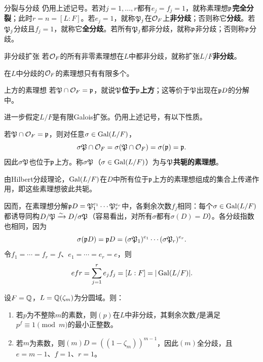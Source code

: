 \begin{definition*}{分裂与分歧}
仍用上述记号。若对$j=1,\ldots,r$都有$e_j=f_j=1$，就称素理想$\mathfrak{p}$\textbf{完全分裂}；此时$r=n=[L:F]$。若$e_j=1$，就称$\mathfrak{P}_j$在$\mathcal O_F$上\textbf{非分歧}；否则称它\textbf{分歧}。若$\mathfrak{P}_j$分歧且$f_j=1$，就称它\textbf{全分歧}。若所有$\mathfrak{P}_j$都非分歧，就称$\mathfrak{p}$非分歧；否则称$\mathfrak{p}$分歧。
\end{definition*}
\begin{definition*}{非分歧扩张}
若$\mathcal O_F$的所有非零素理想在$L$中都非分歧，就称扩张$L/F$\textbf{非分歧}。
\end{definition*}
\begin{property}在$L$中分歧的$\mathcal O_F$的素理想只有有限多个。\end{property}
\begin{definition*}{上方的素理想}
若$\mathfrak{P}\cap\mathcal O_F=\mathfrak{p}$，就说$\mathfrak{P}$\textbf{位于$\mathfrak{p}$上方}；这等价于$\mathfrak{P}$出现在$\mathfrak{p} D$的分解中。
\end{definition*}
进一步假定$L/F$是有限Galois扩张。仍用上述记号，有以下性质。
\begin{property}
若$\mathfrak{P}\cap\mathcal O_F=\mathfrak{p}$，则对任意$\sigma\in\operatorname{Gal}(L/F)$，
\[\sigma\mathfrak{P}\cap\mathcal O_F=\sigma(\mathfrak{P}\cap\mathcal O_F)=\sigma(\mathfrak{p})=\mathfrak{p}.\]
因此$\sigma\mathfrak{P}$也位于$\mathfrak{p}$上方。称$\sigma\mathfrak{P}$（$\sigma\in\operatorname{Gal}(L/F)$）为与$\mathfrak{P}$\textbf{共轭的素理想}。

由Hilbert分歧理论，$\operatorname{Gal}(L/F)$在$D$中所有位于$\mathfrak{p}$上方的素理想组成的集合上传递作用，即这些素理想彼此共轭。
\end{property}
\begin{property}
因而，在素理想分解$\mathfrak{p} D=\mathfrak{P}_1^{e_1}\cdots\mathfrak{P}_r^{e_r}$中，各剩余次数$f_j$相同：每个$\sigma\in\operatorname{Gal}(L/F)$都诱导同构$D/\mathfrak{P}\xrightarrow{\sim}D/\sigma\mathfrak{P}$（容易看出，对所有$\sigma$都有$\sigma(D)=D$）。各分歧指数也相同，因为
\[\sigma(\mathfrak{p} D)=\mathfrak{p} D=(\sigma\mathfrak{P}_1)^{e_1}\cdots(\sigma\mathfrak{P}_r)^{e_r}.\]
令$f_1=\cdots=f_r=f$、$e_1=\cdots=e_r=e$，则
\[efr=\sum_{j=1}^r e_jf_j=[L:F]=|\operatorname{Gal}(L/F)|.\]
\end{property}
\begin{example}\label{L2S1O1}
设$F=\mathbb{Q}$，$L=\mathbb{Q}(\zeta_m)$为分圆域。则：
\begin{enumerate}
\item 若$p$为不整除$m$的素数，则$(p)$在$L$中非分歧，其剩余次数$f$是满足$p^f\equiv1\pmod m$的最小正整数。
\item 若$m$为素数，则$(m)D=((1-\zeta_m))^{m-1}$，因此$(m)$全分歧，且$e=m-1$、$f=1$、$r=1$。
\end{enumerate}
\end{example}
